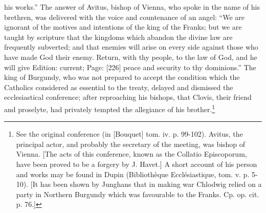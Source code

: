 his works.\texthebrew{}” The answer of Avitus, bishop of Vienna, who spoke in the name of his brethren, was delivered with the voice and countenance of an angel: \texthebrew{“}We are ignorant of the motives and intentions of the king of the Franks; but we are taught by scripture that the kingdoms which abandon the divine law are frequently subverted; and that enemies will arise on every side against those who have made God their enemy. Return, with thy people, to the law of God, and he will give Edition: current; Page: [226] peace and security to thy dominions.\texthebrew{}” The king of Burgundy, who was not prepared to accept the condition which the Catholics considered as essential to the treaty, delayed and dismissed the ecclesiastical conference; after reproaching his bishops, that Clovis, their friend and proselyte, had privately tempted the allegiance of his brother.\footnote{See the original conference (in [Bouquet] tom. iv. p. 99-102). Avitus, the principal actor, and probably the secretary of the meeting, was bishop of Vienna. [The acts of this conference, known as the Collatio Episcoporum, have been proved to be a forgery by J. Havet.] A short account of his person and works may be found in Dupin (Bibliothèque Ecclésiastique, tom. v. p. 5-10). [It has been shown by Junghans that in making war Chlodwig relied on a party in Northern Burgundy which was favourable to the Franks. Cp. op. cit. p. 76.]}

